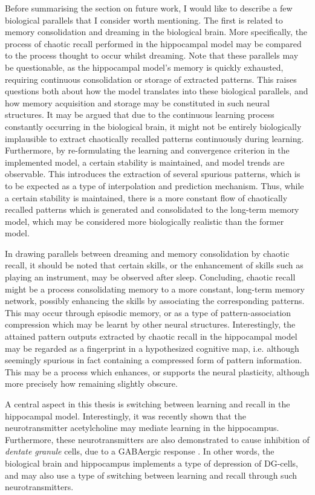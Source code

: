 Before summarising the section on future work, I would like to describe a few biological parallels that I consider worth mentioning. The first is related to memory consolidation and dreaming in the biological brain. More specifically, the process of chaotic recall performed in the hippocampal model may be compared to the process thought to occur whilst dreaming. Note that these parallels may be questionable, as the hippocampal model's memory is quickly exhausted, requiring continuous consolidation or storage of extracted patterns. This raises questions both about how the model translates into these biological parallels, and how memory acquisition and storage may be constituted in such neural structures.
It may be argued that due to the continuous learning process constantly occurring in the biological brain, it might not be entirely biologically implausible to extract chaotically recalled patterns continuously during learning. Furthermore, by re-formulating the learning and convergence criterion in the implemented model, a certain stability is maintained, and model trends are observable. This introduces the extraction of several spurious patterns, which is to be expected as a type of interpolation and prediction mechanism. Thus, while a certain stability is maintained, there is a more constant flow of chaotically recalled patterns which is generated and consolidated to the long-term memory model, which may be considered more biologically realistic than the former model.

In drawing parallels between dreaming and memory consolidation by chaotic recall, it should be noted that certain skills, or the enhancement of skills such as playing an instrument, may be observed after sleep. Concluding, chaotic recall might be a process consolidating memory to a more constant, long-term memory network, possibly enhancing the skills by associating the corresponding patterns. This may occur through episodic memory, or as a type of pattern-association compression which may be learnt by other neural structures. Interestingly, the attained pattern outputs extracted by chaotic recall in the hippocampal model may be regarded as a fingerprint in a hypothesized cognitive map, i.e. although seemingly spurious in fact containing a compressed form of pattern information.
This may be a process which enhances, or supports the neural plasticity, although more precisely how remaining slightly obscure.

A central aspect in this thesis is switching between learning and recall in the hippocampal model. Interestingly, it was recently shown that the neurotransmitter acetylcholine may mediate learning in the hippocampus. Furthermore, these neurotransmitters are also demonstrated to cause inhibition of \textit{dentate granule} cells, due to a GABAergic response \citep{Pabst2016}. In other words, the biological brain and hippocampus implements a type of depression of DG-cells, and may also use a type of switching between learning and recall through such neurotransmitters.

